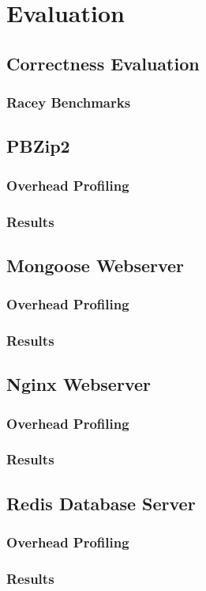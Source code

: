 \chapter{Evaluation}
\section{Correctness Evaluation}
\subsection{Racey Benchmarks}
\section{PBZip2}
\subsection{Overhead Profiling}
\subsection{Results}
\section{Mongoose Webserver}
\subsection{Overhead Profiling}
\subsection{Results}
\section{Nginx Webserver}
\subsection{Overhead Profiling}
\subsection{Results}
\section{Redis Database Server}
\subsection{Overhead Profiling}
\subsection{Results}